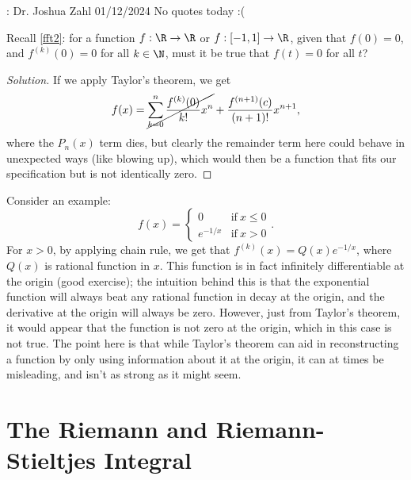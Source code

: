 \begin{nquote}{: Dr. Joshua Zahl 01/12/2024}
	No quotes today :(
\end{nquote}

Recall \cref{fft2}: for a function \(f:\R\to\R\) or \(f:[-1,1]\to\R\), given that \(f(0)=0\), and \(f^{(k)}(0)=0\) for all \(k\in\N\), must it be true that \(f(t)=0\) for all \(t\)?

\begin{proof}[Solution]
	If we apply Taylor's theorem, we get 
	\begin{equation*}
		f(x)=\cancel{\sum_{k=0}^{n}\frac{f^{(k)}(0)}{k!}x^n}+\frac{f^{(n+1)}(c)}{(n+1)!}x^{n+1},
	\end{equation*}
	where the \(P_n(x)\) term dies, but clearly the remainder term here could behave in unexpected ways (like blowing up), which would then be a function that fits our specification but is not identically zero.
\end{proof}
Consider an example:
\begin{equation*}
	f(x)=\begin{cases}
			0&\text{if}~x\leq 0\\
			e^{-1/x}&\text{if}~x>0
	 	 \end{cases}.
\end{equation*}
For \(x>0\), by applying chain rule, we get that \(f^{(k)}(x)=Q(x)e^{-1/x}\), where \(Q(x)\) is rational function in \(x\). This function is in fact infinitely differentiable at the origin (good exercise); the intuition behind this is that the exponential function will always beat any rational function in decay at the origin, and the derivative at the origin will always be zero. However, just from Taylor's theorem, it would appear that the function is not zero at the origin, which in this case is not true. The point here is that while Taylor's theorem can aid in reconstructing a function by only using information about it at the origin, it can at times be misleading, and isn't as strong as it might seem.

\section{The Riemann and Riemann-Stieltjes Integral}

